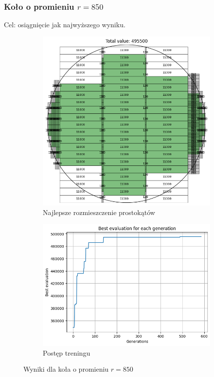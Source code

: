 \documentclass{article}
\begin{document}
\subsubsection*{Koło o promieniu $r=850$}
Cel: osiągnięcie jak najwyższego wyniku.
\begin{figure}[H]
    \centering
    \begin{subfigure}{0.48\textwidth}
        \includegraphics[width=\linewidth]{img/ae2/r850_fit.png}
        \caption{Najlepsze rozmieszczenie prostokątów}
    \end{subfigure}
    \hfill
    \begin{subfigure}{0.48\textwidth}
        \includegraphics[width=\linewidth]{img/ae2/r850_history.png}
        \caption{Postęp treningu}
    \end{subfigure}
    \caption{Wyniki dla koła o promieniu $r=850$}
\end{figure}
\end{document}
